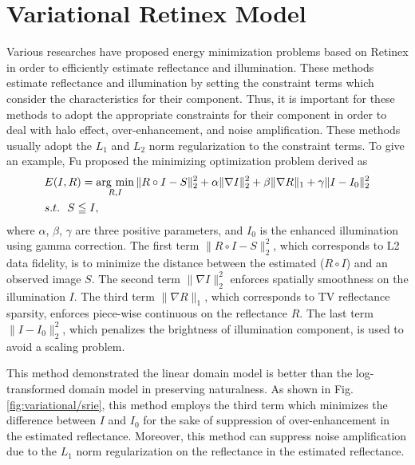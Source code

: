 \section{Variational Retinex Model} \label{sec:variational_retinex}
Various researches have proposed energy minimization problems based on Retinex in order to efficiently estimate reflectance and illumination. These methods estimate reflectance and illumination by setting the constraint terms which consider the characteristics for their component. Thus, it is important for these methods to adopt the appropriate constraints for their component in order to deal with halo effect, over-enhancement, and noise amplification. These methods usually adopt the $L_{1}$ and $L_{2}$ norm regularization to the constraint terms. To give an example, Fu \cite{srie} proposed the minimizing optimization problem derived as
\begin{equation}
\begin{split}
& E(I, R) = \mathop{\rm arg~min}\limits_{R, I} \|R \circ I - S\|_{2}^{2} + \alpha\|\nabla{I}\|_{2}^{2} + \beta\|\nabla{R}\|_{1} + \gamma\|I - I_{0}\|_{2}^{2} \\
& s.t. \ \ S \leqq I, \label{eq:srie_equation}
\end{split}
\end{equation}
where $\alpha$, $\beta$, $\gamma$ are three positive parameters, and $I_{0}$ is the enhanced illumination using gamma correction.
The first term $\|R \circ I - S\|_{2}^{2}$, which corresponds to L2 data fidelity, is to minimize the distance between the estimated ($R\circ{I}$) and an observed image $S$. The second term $\|\nabla{I}\|_{2}^{2} $ enforces spatially smoothness on the illumination $I$. The third term $\|\nabla{R}\|_{1}$, which corresponds to TV reflectance sparsity, enforces piece-wise continuous on the reflectance $R$. The last term $\|I-I_{0}\|_{2}^{2}$, which penalizes the brightness of illumination component, is used to avoid a scaling problem. \par
This method demonstrated the linear domain model is better than the log-transformed domain model in preserving naturalness. As shown in Fig. \ref{fig:variational/srie}, this method employs the third term which minimizes the difference between $I$ and $I_{0}$ for the sake of suppression of over-enhancement in the estimated reflectance. Moreover, this method can suppress noise amplification due to the $L_{1}$ norm regularization on the reflectance in the estimated reflectance.

